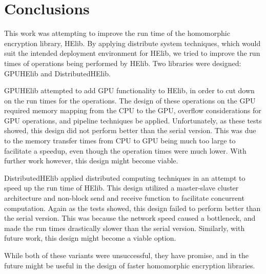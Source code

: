 \chapter{Conclusions} \label{chap:Conclusions}
This work was attempting to improve the run time of the homomorphic encryption library, HElib. By applying distribute system techniques, which would suit the intended deployment environment for HElib, we tried to improve the run times of operations being performed by HElib. Two libraries were designed: GPUHElib and DistributedHElib. 

GPUHElib attempted to add GPU functionality to HElib, in order to cut down on the run times for the operations. The design of these operations on the GPU required memory mapping from the CPU to the GPU, overflow considerations for GPU operations, and pipeline techniques be applied. Unfortunately, as these tests showed, this design did not perform better than the serial version. This was due to the memory transfer times from CPU to GPU being much too large to facilitate a speedup, even though the operation times were much lower. With further work however, this design might become viable.

DistributedHElib applied distributed computing techniques in an attempt to speed up the run time of HElib. This design utilized a master-slave cluster architecture and non-block send and receive function to facilitate concurrent computation. Again as the tests showed, this design failed to perform better than the serial version. This was because the network speed caused a bottleneck, and made the run times drastically slower than the serial version. Similarly, with future work, this design might become a viable option.

While both of these variants were unsuccessful, they have promise, and in the future might be useful in the design of faster homomorphic encryption libraries.